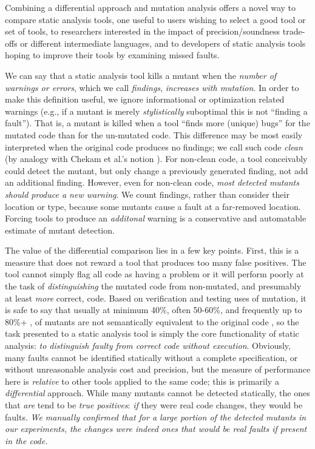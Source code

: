 Combining a differential approach and mutation analysis offers a novel way to compare static analysis tools, one useful to users wishing to select a good tool or set of tools, to researchers interested in the impact of precision/soundness trade-offs or different intermediate languages, and to developers of static analysis tools hoping to improve their tools by examining missed faults.


We can say that a static analysis tool kills a mutant when the \emph{number of warnings or errors}, which we call \emph{findings}, \emph{increases with mutation}.  In order to make this definition useful, we ignore informational or optimization related warnings (e.g., if a mutant is merely \emph{stylistically} suboptimal this is not ``finding a fault''). That is, a mutant is killed when a tool ``finds more (unique) bugs'' for the mutated code than for the un-mutated code.  This difference may be most easily interpreted when the original code produces no findings; we call such code \emph{clean} (by analogy with Chekam et al.'s notion \cite{CleanProgram}). For non-clean code, a tool conceivably could detect the mutant, but only change a previously generated finding, not add an additional finding.  However, even for non-clean code, \emph{most detected mutants should produce a new warning}.  We count findings, rather than consider their location or type, because some mutants cause a fault at a far-removed location.  Forcing tools to produce an \emph{additonal} warning is a conservative and automatable estimate of mutant detection.

The value of the differential comparison lies in a few key points.  First, this is a measure that does not reward a tool that produces too many false positives.  The tool cannot simply flag all code as having a problem or it will perform poorly at the task of \emph{distinguishing} the mutated code from non-mutated, and presumably at least \emph{more} correct, code.  Based on verification and testing uses of mutation, it is safe to say that usually at minimum 40\%, often 50-60\%, and frequently up to 80\%+ \cite{mutKernel,groce2018verified,le2014mucheck}, of mutants are not semantically equivalent to the original code \cite{TCE,impactEquiv,smith2009should}, so the task presented to a static analysis tool is simply the core functionality of static analysis: \emph{to distinguish faulty from correct code without execution}.  Obviously, many faults cannot be identified statically without a complete specification, or without unreasonable analysis cost and precision, but the measure of performance here is \emph{relative} to other tools applied to the same code; this is primarily a \emph{differential} approach.  While many mutants cannot be detected statically, the ones that \emph{are} tend to be \emph{true positives}: \emph{if} they were real code changes, they would be faults.  \emph{We manually confirmed that for a large portion of the detected mutants in our experiments, the changes were indeed ones that would be real faults if present in the code.}

